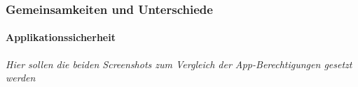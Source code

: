 \begin{frame}
\frametitle{Gemeinsamkeiten und Unterschiede}
\framesubtitle{Applikationssicherheit}
\small\textsl{Hier sollen die beiden Screenshots zum Vergleich der
App-Berechtigungen gesetzt werden}
\end{frame}